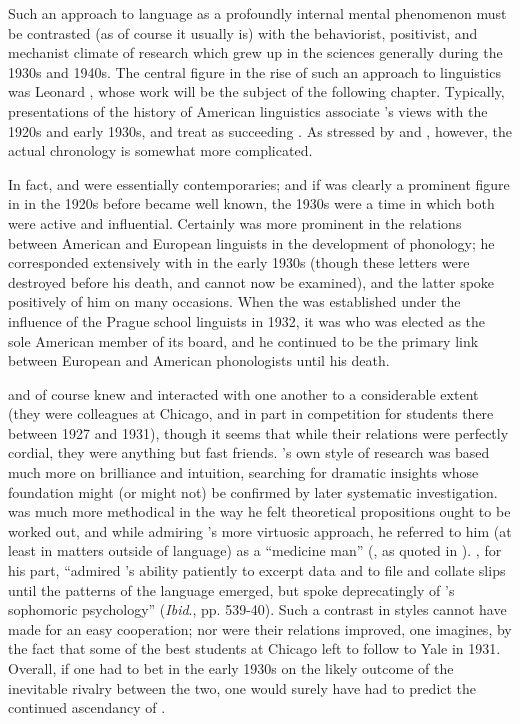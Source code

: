 Such an approach to language as a profoundly internal mental
phenomenon must be contrasted (as of course it usually is) with the
behaviorist, positivist, and mechanist climate of research which grew
up in the sciences generally during the 1930s and 1940s. The central
figure in the rise of such an approach to linguistics was Leonard
{\Bloomfield}, whose work will be the subject of the following
chapter. Typically, presentations of the history of American
linguistics associate {\Sapir}'s views with the 1920s and early 1930s,
and treat {\Bloomfield} as succeeding {\Sapir}. As stressed by
\citet{hymes.fought81:structuralism} and
\citet{murray93:theory.groups}, however, the actual chronology is
somewhat more complicated.

In fact, {\Bloomfield} and {\Sapir} were essentially contemporaries; and if
{\Sapir} was clearly a prominent figure in  in the 1920s
before {\Bloomfield} became well known, the 1930s were a time in which
both were active and influential. Certainly {\Sapir} was more prominent
in the relations between American and European linguists in the
development of phonology; he corresponded extensively with {\Trubetzkoy}
in the early 1930s (though these letters were destroyed before his
death, and cannot now be examined), and the latter spoke positively of
him on many occasions. When the 
was established under the influence of the Prague school linguists in
1932, it was {\Sapir} who was elected as the sole American member of its
board, and he continued to be the primary link between European and
American phonologists until his death.

{\Sapir} and {\Bloomfield} of course knew and interacted with one another to
a considerable extent (they were colleagues at Chicago, and in part in
competition for students there between 1927 and 1931), though it seems
that while their relations were perfectly cordial, they were anything
but fast friends. {\Sapir}'s own style of research was based much more on
brilliance and intuition, searching for dramatic insights whose
foundation might (or might not) be confirmed by later systematic
investigation. {\Bloomfield} was much more methodical in the way he felt
theoretical propositions ought to be worked out, and while admiring
{\Sapir}'s more virtuosic approach, he referred to him (at least in
matters outside of language) as a ``medicine man'' (, as
quoted in \citealt[540]{hockett70:bloomfield.anthology}).  {\Sapir}, for
his part, ``admired {\Bloomfield}'s ability patiently to excerpt data and
to file and collate slips until the patterns of the language emerged,
but spoke deprecatingly of {\Bloomfield}'s sophomoric psychology''
(\emph{Ibid}., pp. 539-40). Such a {contrast} in styles cannot have made
for an easy cooperation; nor were their relations improved, one
imagines, by the fact that some of the best students at Chicago left
to follow {\Sapir} to Yale in 1931. Overall, if one had to bet in the
early 1930s on the likely outcome of the inevitable rivalry between
the two, one would surely have had to predict the continued ascendancy
of {\Sapir}.

